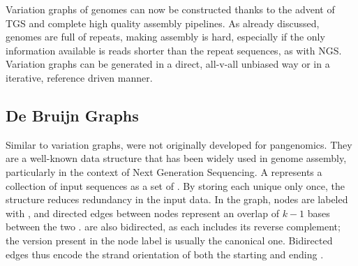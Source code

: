 Variation graphs of genomes can now be constructed thanks to the advent of TGS and complete high quality assembly pipelines. As already discussed, genomes are full of repeats, making assembly is hard, especially if the only information available is reads shorter than the repeat sequences, as with NGS.\\
Variation graphs can be generated in a direct, all-v-all unbiased way or in a iterative, reference driven manner.



\subsection{De Bruijn Graphs}
\label{sec:dbg_intro}
Similar to variation graphs,  \dbgs were not originally developed for pangenomics. They are a well-known data structure that has been widely used in genome assembly, particularly in the context of Next Generation Sequencing.
A \dbg represents a collection of input sequences as a set of \kmers. By storing each unique \kmer only once, the structure reduces redundancy in the input data. In the graph, nodes are labeled with \kmers, and directed edges between nodes represent an overlap of $k-1$ bases between the two \kmers. \dbgs are also bidirected, as each \kmer includes its reverse complement; the version present in the node label is usually the canonical one. Bidirected edges thus encode the strand orientation of both the starting and ending \kmers.

